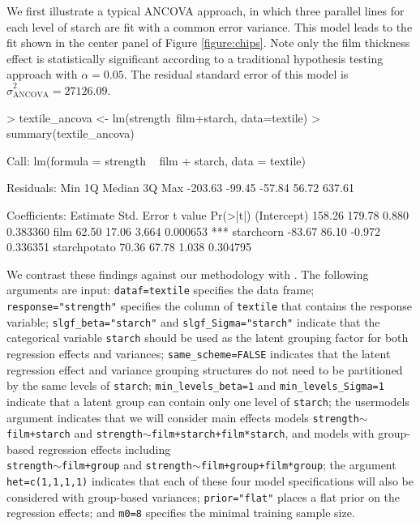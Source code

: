 We first illustrate a typical ANCOVA approach, in which three parallel lines for each level of starch are fit with a common error variance. This model leads to the fit shown in the center panel of Figure \ref{figure:chips}. Note only the film thickness effect is statistically significant according to a traditional hypothesis testing approach with $\alpha=0.05$. The residual standard error of this model is $\hat{\sigma}^2_{\text{ANCOVA}}=27126.09$. 

\begin{example*}\label{example:ancovaexample}
> textile_ancova <- lm(strength~film+starch, data=textile)
> summary(textile_ancova)

Call:
lm(formula = strength ~ film + starch, data = textile)

Residuals:
    Min      1Q  Median      3Q     Max 
-203.63  -99.45  -57.84   56.72  637.61 

Coefficients:
             Estimate Std. Error t value Pr(>|t|)    
(Intercept)    158.26     179.78   0.880 0.383360    
film            62.50      17.06   3.664 0.000653 ***
starchcorn     -83.67      86.10  -0.972 0.336351    
starchpotato    70.36      67.78   1.038 0.304795 
\end{example*}

We contrast these findings against our methodology with . The following arguments are input: \texttt{dataf=textile} specifies the data frame; \texttt{response="strength"} specifies the column of \texttt{textile} that contains the response variable; \texttt{slgf\_beta="starch"} and \texttt{slgf\_Sigma="starch"} indicate that the categorical variable \texttt{starch} should be used as the latent grouping factor for both regression effects and variances; \texttt{same\_scheme=FALSE} indicates that the latent regression effect and variance grouping structures do not need to be partitioned by the same levels of \texttt{starch}; \texttt{min\_levels\_beta=1} and \texttt{min\_levels\_Sigma=1} indicate that a latent group can contain only one level of \texttt{starch}; the usermodels argument indicates that we will consider main effects models \texttt{strength}$\sim$\texttt{film+starch} and \texttt{strength}$\sim$\texttt{film+starch+film*starch}, and models with group-based regression effects including \\ \texttt{strength}$\sim$\texttt{film+group} and \texttt{strength}$\sim$\texttt{film+group+film*group}; the argument \texttt{het=c(1,1,1,1)} indicates that each of these four model specifications will also be considered with group-based variances; \texttt{prior="flat"} places a flat prior on the regression effects; and \texttt{m0=8} specifies the minimal training sample size. 

